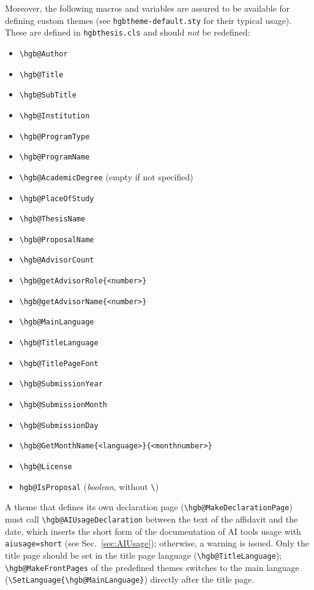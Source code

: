 \documentclass[language=english]{hgbarticle}
\begin{document}
\noindent
Moreover, the following macros and variables are assured to be available for defining custom themes
(see \texttt{hgbtheme-default.sty} for their typical usage).
These are defined in \texttt{hgbthesis.cls} and should \emph{not} be redefined:
%
\begin{itemize}
  \item[] \verb!\hgb@Author!
  \item[] \verb!\hgb@Title!
  \item[] \verb!\hgb@SubTitle!
  \item[] \verb!\hgb@Institution!
  \item[] \verb!\hgb@ProgramType!
  \item[] \verb!\hgb@ProgramName!
  \item[] \verb!\hgb@AcademicDegree! (empty if not specified)
  \item[] \verb!\hgb@PlaceOfStudy!
\medskip
	\item[] \verb!\hgb@ThesisName!
	\item[] \verb!\hgb@ProposalName!
\medskip
  \item[] \verb!\hgb@AdvisorCount!
  \item[] \verb!\hgb@getAdvisorRole{<number>}!
  \item[] \verb!\hgb@getAdvisorName{<number>}!
\medskip
  \item[] \verb!\hgb@MainLanguage!
  \item[] \verb!\hgb@TitleLanguage!
  \item[] \verb!\hgb@TitlePageFont!
\medskip 
  \item[] \verb!\hgb@SubmissionYear!
  \item[] \verb!\hgb@SubmissionMonth!
  \item[] \verb!\hgb@SubmissionDay!
  \item[] \verb!\hgb@GetMonthName{<language>}{<monthnumber>}!
\medskip
	\item[] \verb!\hgb@License!
\medskip
  \item[] \verb!hgb@IsProposal! (\emph{boolean}, without \verb!\!)
\end{itemize}
%
A theme that defines its own declaration page (\verb!\hgb@MakeDeclarationPage!) must call
\verb!\hgb@AIUsageDeclaration! between the text of the affidavit and the date, which inserts the short
form of the documentation of AI tools usage with \texttt{aiusage=short} (see Sec.~\ref{sec:AIUsage});
otherwise, a warning is issued. Only the title page should be set in the title page language
(\verb!\hgb@TitleLanguage!); \verb!\hgb@MakeFrontPages! of the predefined themes switches to the main
language (\verb!\SetLanguage{\hgb@MainLanguage}!) directly after the title page.
\end{document}
